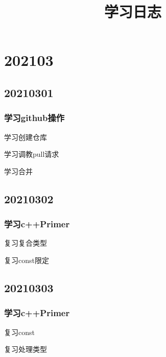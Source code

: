 \documentclass{article} %
\begin{document}

\begin{titlepage}           %
\title{学习日志} %
\maketitle                  %
\end{titlepage}
\tableofcontents        %
\newpage                %

\section{202103}      %
\subsection{20210301}
\subsubsection{学习github操作}
    学习创建仓库\par
    学习调教pull请求\par
    学习合并\par
\subsection{20210302}
\subsubsection{学习c++Primer}
    复习复合类型\par
    复习const限定\par
\subsection{20210303}
\subsubsection{学习c++Primer}
    复习const\par
    复习处理类型\par
\end{document}
